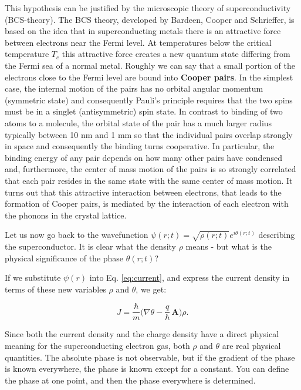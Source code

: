 \documentclass[a4paper,11pt]{article}
\begin{document}
This hypothesis can be justified by the microscopic theory of superconductivity (BCS-theory). The BCS theory, developed by Bardeen, Cooper and Schrieffer, is based on the idea that in superconducting metals there is an attractive force between electrons near the Fermi level. At temperatures below the critical temperature $T_c$ this
attractive force creates a new quantum state differing from the Fermi sea of a normal metal. Roughly we can say that a small portion of the electrons close to the Fermi level are bound into {\bf Cooper pairs}.
\newline In the simplest case, the internal motion of the pairs has no orbital angular momentum (symmetric state) and consequently Pauli’s principle requires that the two spins must be in a singlet (antisymmetric) spin state. In contrast to binding of two atoms to a molecule, the orbital state of the pair has a much larger radius typically between 10 nm and 1 mm so that the individual pairs overlap strongly in space and consequently the binding turns cooperative. In particular, the binding energy of any pair depends on how many other pairs have condensed and, furthermore, the center of mass motion of the pairs is so strongly correlated that each pair resides in the same state with the same center of mass motion.
\newline It turns out that this attractive interaction between electrons, that leads to the formation of Cooper pairs, is mediated by the interaction of each electron with the phonons in the crystal lattice.



Let us now go back to the wavefunction $\psi (r;t) = \sqrt{\rho(r; t)} e^{i\theta(r; t)}$ describing the superconductor. It is clear what the density $\rho$ means - but what is the physical significance of the phase $\theta(r; t)$?

If we substitute $\psi (r)$ into Eq. \ref{eq:current}, and express the current density in terms of these new variables $\rho$ and $\theta$, we get:

\begin{equation}
\label{eq:SC_J}
J=\frac{\hbar}{m}\biggl(
\nabla \theta - \frac{q}{\hbar}\,\mathbf{A}\biggr)\rho.
\end{equation}

Since both the current density and the charge density have a direct physical meaning for the superconducting electron gas, both $\rho$ and $\theta$ are real physical quantities. The absolute phase is not observable, but if the gradient of the phase is known everywhere, the phase is known except for a constant. You can define the phase at one point, and then the phase everywhere is determined.
\end{document}
